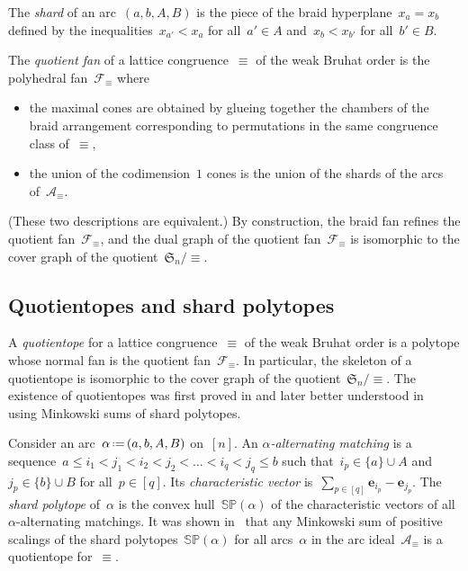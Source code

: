 \documentclass{amsart}
\theoremstyle{definition}
\newcommand{\R}{\mathbb{R}} %
\renewcommand{\c}[1]{\mathcal{#1}} %
\renewcommand{\b}[1]{{\boldsymbol{#1}}} %
\newcommand{\f}[1]{\mathfrak{#1}} %
\newcommand{\set}[2]{\left\{ #1 \;\middle|\; #2 \right\}} %
\newcommand{\eqdef}{\mbox{\,\raisebox{0.2ex}{\scriptsize\ensuremath{\mathrm:}}\ensuremath{=}\,}} %
\newcommand{\darkblue}{\color{darkblue}} %
\newcommand{\defn}[1]{\textsl{\darkblue #1}} %
\newcommand{\polytope}[1]{\mathds{#1}} %
\newcommand{\SP}{\polytope{SP}}
\begin{document}
The \defn{shard} of an arc~$(a, b, A, B)$ is the piece of the braid hyperplane~${x_a = x_b}$ defined by the inequalities~$x_{a'} < x_a$ for all~$a' \in A$ and~$x_b < x_{b'}$ for all~$b' \in B$.

The \defn{quotient fan} of a lattice congruence~$\equiv$ of the weak Bruhat order is the polyhedral fan~$\c{F}_\equiv$ where
\begin{itemize}
\item the maximal cones are obtained by glueing together the chambers of the braid arrangement corresponding to permutations in the same congruence class of~$\equiv$,
\item the union of the codimension~$1$ cones is the union of the shards of the arcs of~$\c{A}_\equiv$.
\end{itemize}
(These two descriptions are equivalent.)
By construction, the braid fan refines the quotient fan~$\c{F}_\equiv$, and the dual graph of the quotient fan~$\c{F}_\equiv$ is isomorphic to the cover graph of the quotient~$\f{S}_n/{\equiv}$.

\subsection{Quotientopes and shard polytopes}

A \defn{quotientope} for a lattice congruence~$\equiv$ of the weak Bruhat order is a polytope whose normal fan is the quotient fan~$\c{F}_\equiv$.
In particular, the skeleton of a quotientope is isomorphic to the cover graph of the quotient~$\f{S}_n/{\equiv}$.
The existence of quotientopes was first proved in \cite{PilaudSantos} and later better understood in~\cite{PadrolPilaudRitter} using Minkowski sums of shard polytopes.

Consider an arc~$\alpha \eqdef (a, b, A, B)$ on~$[n]$.
An \defn{$\alpha$-alternating matching} is a sequence~$a \le i_1 < j_1 < i_2 < j_2 < \dots < i_q < j_q \le b$ such that~$i_p \in \{a\} \cup A$ and~$j_p \in \{b\} \cup B$ for all~$p \in [q]$.
Its \defn{characteristic vector} is~$\sum_{p \in [q]} \b{e}_{i_p} - \b{e}_{j_p}$.
The \defn{shard polytope} of~$\alpha$ is the convex hull~$\SP(\alpha)$ of the characteristic vectors of all $\alpha$-alternating matchings.
It was shown in~\cite{PadrolPilaudRitter} that any Minkowski sum of positive scalings of the shard polytopes~$\SP(\alpha)$ for all arcs~$\alpha$ in the arc ideal~$\c{A}_\equiv$ is a quotientope for~$\equiv$.
\end{document}
